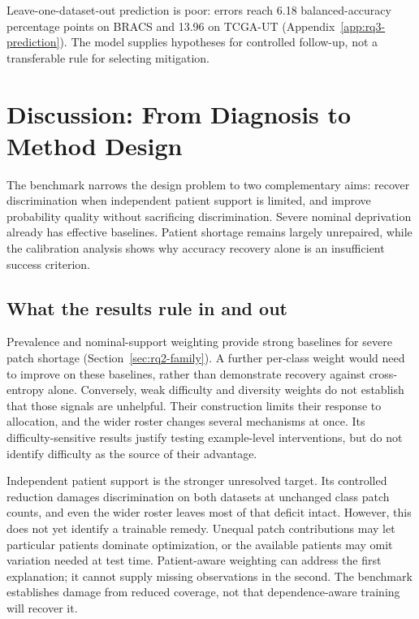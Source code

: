 \documentclass[11pt]{article}
\begin{document}
Leave-one-dataset-out prediction is poor: errors reach \num{6.18} balanced-accuracy percentage points on BRACS and \num{13.96} on TCGA-UT (Appendix~\ref{app:rq3-prediction}). The model supplies hypotheses for controlled follow-up, not a transferable rule for selecting mitigation.

\section{Discussion: From Diagnosis to Method Design}
\label{sec:discussion}
The benchmark narrows the design problem to two complementary aims: recover discrimination when independent patient support is limited, and improve probability quality without sacrificing discrimination. Severe nominal deprivation already has effective baselines. Patient shortage remains largely unrepaired, while the calibration analysis shows why accuracy recovery alone is an insufficient success criterion.

\subsection{What the results rule in and out}
\label{sec:discussion-evidence}
\label{sec:discussion-signal}
\label{sec:discussion-mechanism}
Prevalence and nominal-support weighting provide strong baselines for severe patch shortage (Section~\ref{sec:rq2-family}). A further per-class weight would need to improve on these baselines, rather than demonstrate recovery against cross-entropy alone. Conversely, weak difficulty and diversity weights do not establish that those signals are unhelpful. Their construction limits their response to allocation, and the wider roster changes several mechanisms at once. Its difficulty-sensitive results justify testing example-level interventions, but do not identify difficulty as the source of their advantage.

Independent patient support is the stronger unresolved target. Its controlled reduction damages discrimination on both datasets at unchanged class patch counts, and even the wider roster leaves most of that deficit intact. However, this does not yet identify a trainable remedy. Unequal patch contributions may let particular patients dominate optimization, or the available patients may omit variation needed at test time. Patient-aware weighting can address the first explanation; it cannot supply missing observations in the second. The benchmark establishes damage from reduced coverage, not that dependence-aware training will recover it.
\end{document}
